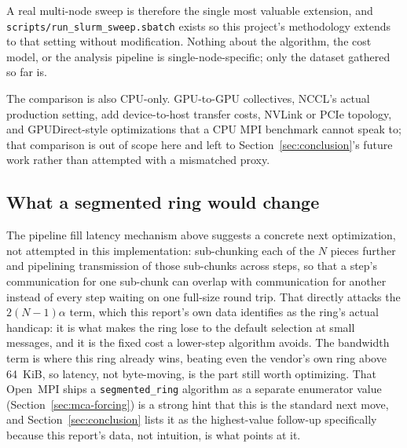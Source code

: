 A real multi-node sweep is therefore the single most valuable extension, and \texttt{scripts/run\_slurm\_sweep.sbatch} exists so this project's methodology extends to that setting without modification. Nothing about the algorithm, the cost model, or the analysis pipeline is single-node-specific; only the dataset gathered so far is.

The comparison is also CPU-only. GPU-to-GPU collectives, NCCL's actual production setting, add device-to-host transfer costs, NVLink or PCIe topology, and GPUDirect-style optimizations that a CPU MPI benchmark cannot speak to; that comparison is out of scope here and left to Section~\ref{sec:conclusion}'s future work rather than attempted with a mismatched proxy.

\subsection{What a segmented ring would change}

The pipeline fill latency mechanism above suggests a concrete next optimization, not attempted in this implementation: sub-chunking each of the $N$ pieces further and pipelining transmission of those sub-chunks across steps, so that a step's communication for one sub-chunk can overlap with communication for another instead of every step waiting on one full-size round trip. That directly attacks the $2(N-1)\alpha$ term, which this report's own data identifies as the ring's actual handicap: it is what makes the ring lose to the default selection at small messages, and it is the fixed cost a lower-step algorithm avoids. The bandwidth term is where this ring already wins, beating even the vendor's own ring above 64~KiB, so latency, not byte-moving, is the part still worth optimizing. That Open~MPI ships a \texttt{segmented\_ring} algorithm as a separate enumerator value (Section~\ref{sec:mca-forcing}) is a strong hint that this is the standard next move, and Section~\ref{sec:conclusion} lists it as the highest-value follow-up specifically because this report's data, not intuition, is what points at it.
